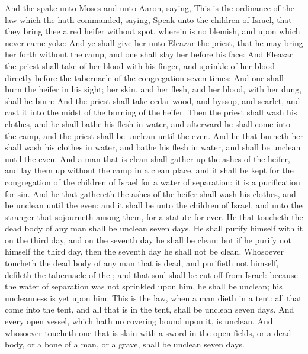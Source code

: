 \begin{biblechapter} %
 And the \LORD spake unto Moses and unto Aaron, saying,
\verse This is the ordinance of the law which the \LORD hath commanded, saying, Speak unto the children of Israel, that they bring thee a red heifer without spot, wherein is no blemish, and upon which never came yoke:
\verse And ye shall give her unto Eleazar the priest, that he may bring her forth without the camp, and one shall slay her before his face:
\verse And Eleazar the priest shall take of her blood with his finger, and sprinkle of her blood directly before the tabernacle of the congregation seven times:
\verse And one shall burn the heifer in his sight; her skin, and her flesh, and her blood, with her dung, shall he burn:
\verse And the priest shall take cedar wood, and hyssop, and scarlet, and cast it into the midst of the burning of the heifer.
\verse Then the priest shall wash his clothes, and he shall bathe his flesh in water, and afterward he shall come into the camp, and the priest shall be unclean until the even.
\verse And he that burneth her shall wash his clothes in water, and bathe his flesh in water, and shall be unclean until the even.
\verse And a man that is clean shall gather up the ashes of the heifer, and lay them up without the camp in a clean place, and it shall be kept for the congregation of the children of Israel for a water of separation: it is a purification for sin.
\verse And he that gathereth the ashes of the heifer shall wash his clothes, and be unclean until the even: and it shall be unto the children of Israel, and unto the stranger that sojourneth among them, for a statute for ever.
\verse He that toucheth the dead body of any man shall be unclean seven days.
\verse He shall purify himself with it on the third day, and on the seventh day he shall be clean: but if he purify not himself the third day, then the seventh day he shall not be clean.
\verse Whosoever toucheth the dead body of any man that is dead, and purifieth not himself, defileth the tabernacle of the \LORD; and that soul shall be cut off from Israel: because the water of separation was not sprinkled upon him, he shall be unclean; his uncleanness is yet upon him.
\verse This is the law, when a man dieth in a tent: all that come into the tent, and all that is in the tent, shall be unclean seven days.
\verse And every open vessel, which hath no covering bound upon it, is unclean.
\verse And whosoever toucheth one that is slain with a sword in the open fields, or a dead body, or a bone of a man, or a grave, shall be unclean seven days.

\end{biblechapter}
